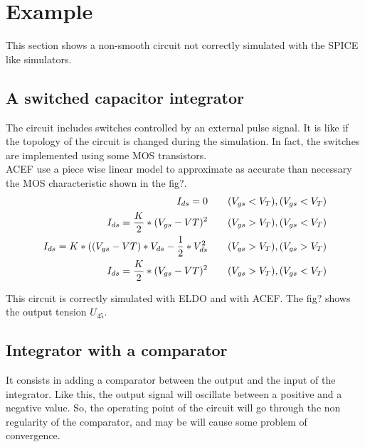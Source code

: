 \newpage
\section{Example}
This section shows a non-smooth circuit not correctly simulated with the SPICE like simulators.
 
\subsection{A switched capacitor integrator}


\begin{figure}[!h]
\centerline{
 \scalebox{0.7}{
    
 }
 }\end{figure}



The circuit includes switches controlled by an external pulse signal. It is like if the topology of the circuit is changed
during the simulation. In fact, the switches are implemented using some MOS transistors.\\
ACEF use a piece wise linear model to approximate as accurate than necessary the MOS characteristic
shown in the fig?.\\


\begin{eqnarray}
I_{ds}=0 \qquad (V_{gs} < V_{T}) , (V_{gs} < V_{T})\\
I_{ds}=\frac{K}{2} * (V_{gs}-V{T})^2 \qquad (V_{gs} > V_{T}) , (V_{gs} < V_{T})\\
I_{ds}=K *((V_{gs}-V{T})*V_{ds} - \frac{1}{2}*V_{ds}^2 \qquad (V_{gs} > V_{T}) , (V_{gs} > V_{T})\\
I_{ds}=\frac{K}{2} * (V_{gs}-V{T})^2 \qquad (V_{gs} > V_{T}) , (V_{gs} < V_{T})\\
\end{eqnarray}

This circuit is correctly simulated with ELDO and with ACEF. The fig? shows the output tension $U_{45}$.\\

\subsection{ Integrator with a comparator}
It consists in adding a comparator between the output and the input of the integrator. Like this,
the output signal will oscillate between a positive and a negative value. So, the operating point of
the circuit will go through the non regularity of the comparator, and may be will cause some problem of
convergence.





